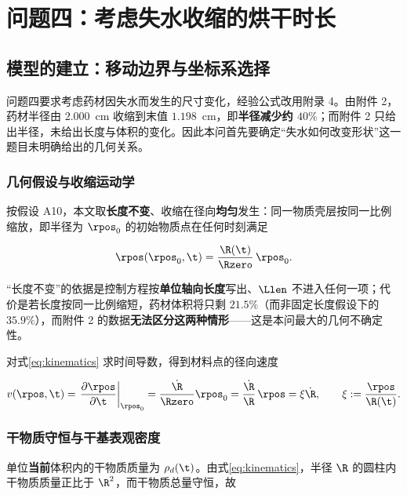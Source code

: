 \section{问题四：考虑失水收缩的烘干时长}
\label{sec:q4}

\subsection{模型的建立：移动边界与坐标系选择}
\label{sec:q4model}

问题四要求考虑药材因失水而发生的尺寸变化，经验公式改用附录 4。由附件 2，药材半径由 $2.000$~cm 收缩到末值 $1.198$~cm，即\textbf{半径减少约 $40\%$}；而附件 2 只给出半径，未给出长度与体积的变化。因此本问首先要确定``失水如何改变形状''这一题目未明确给出的几何关系。

\subsubsection{几何假设与收缩运动学}

按假设 A10，本文取\textbf{长度不变}、收缩在径向\textbf{均匀}发生：同一物质壳层按同一比例缩放，即半径为 ${\rpos}_0$ 的初始物质点在任何时刻满足

\begin{equation}
\rpos({\rpos}_0,\t)=\frac{\R(\t)}{\Rzero}\,{\rpos}_0 .
\label{eq:kinematics}
\end{equation}

``长度不变''的依据是控制方程按\textbf{单位轴向长度}写出、$\Llen$ 不进入任何一项；代价是若长度按同一比例缩短，药材体积将只剩 $21.5\%$（而非固定长度假设下的 $35.9\%$），而附件 2 的数据\textbf{无法区分这两种情形}——这是本问最大的几何不确定性。

对式\eqref{eq:kinematics} 求时间导数，得到材料点的径向速度

\begin{equation}
v(\rpos,\t)=\left.\frac{\partial \rpos}{\partial \t}\right|_{{\rpos}_0}
=\frac{\dot \R}{\Rzero}{\rpos}_0=\frac{\dot \R}{\R}\,\rpos=\xi\dot \R,
\qquad \xi:=\frac{\rpos}{\R(\t)} .
\label{eq:materialvelocity}
\end{equation}

\subsubsection{干物质守恒与干基表观密度}

单位\textbf{当前}体积内的干物质质量为 $\rho_d(\t)$。由式\eqref{eq:kinematics}，半径 $\R$ 的圆柱内干物质质量正比于 ${\R}^2$，而干物质总量守恒，故

